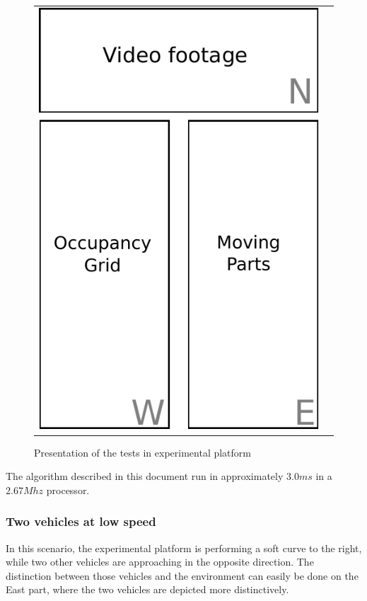 \begin{figure}[H]
   \centering
     \begin{tabular}{lr}
       \includegraphics[scale=0.60]{img/fig:result:framework}
     \end{tabular}
   \caption{Presentation of the tests in experimental platform}
   \label{fig:result:framework}
\end{figure}

The algorithm described in this document run in approximately $3.0ms$ in a $2.67Mhz$ processor.

\subsubsection{Two vehicles at low speed}

In this scenario, the experimental platform is performing a soft curve to the right, while two other vehicles are approaching in the opposite direction. The distinction between those vehicles and the environment can easily be done on the East part, where the two vehicles are depicted more distinctively.

